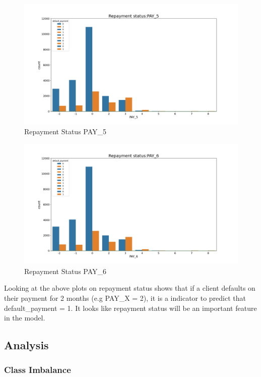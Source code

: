 \documentclass[
]{article}
\begin{document}
\begin{figure}

{\centering \includegraphics[width=0.8\linewidth]{../results/repayment_status_PAY_5} 

}

\caption{Repayment Status PAY_5}\label{fig:repayment-status-PAY-5}
\end{figure}

\begin{figure}

{\centering \includegraphics[width=0.8\linewidth]{../results/repayment_status_PAY_6} 

}

\caption{Repayment Status PAY_6}\label{fig:repayment-status-PAY-6}
\end{figure}

Looking at the above plots on repayment status shows that if a client
defaults on their payment for 2 months (e.g PAY\_X = 2), it is a
indicator to predict that default\_payment = 1. It looks like repayment
status will be an important feature in the model.

\hypertarget{analysis}{%
\subsection{Analysis}\label{analysis}}

\hypertarget{class-imbalance}{%
\subsubsection{Class Imbalance}\label{class-imbalance}}
\end{document}
